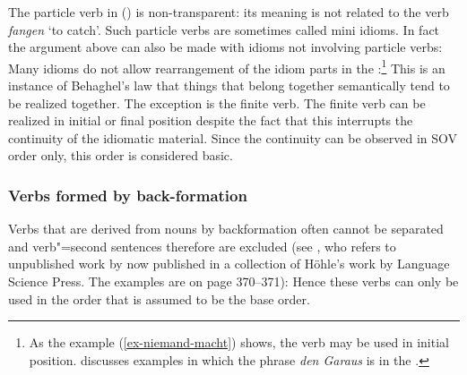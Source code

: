 \noindent
The particle verb in () is non-transparent: its meaning is not related to the verb
\emph{fangen} `to catch'. Such particle verbs are sometimes called mini
idioms. In fact the argument above can also be made with idioms not involving particle verbs: Many idioms do not allow
rearrangement of the idiom parts in the \mf:\footnote{
  As the example (\ref{ex-niemand-macht}) shows, the verb may be used in initial position. \citet[]{MuellerLehrbuch3} discusses examples in which the phrase \emph{den Garaus} is in the \vf.
}
\eal
{}
\zl
This is an instance of Behaghel's law \citeyearpar{Behaghel32-u}
that things that belong together semantically tend to be realized together. The exception is the
finite verb. The finite verb can be realized in initial or final position despite the fact that this
interrupts the continuity of the idiomatic material. Since the continuity can be observed in SOV
order only, this order is considered basic.

\subsubsection{Verbs formed by back-formation}

Verbs that are derived from nouns by backformation often cannot be separated and verb"=second
sentences therefore are excluded (see \citealt[]{Haider93a}, who refers to unpublished work
by \citealt{Hoehle91b} now published in a collection of Höhle's work by Language Science Press. The
examples are on page 370--371):
\eal
{}
\zl
Hence these verbs can only be used in the order that is assumed to be the base order.

